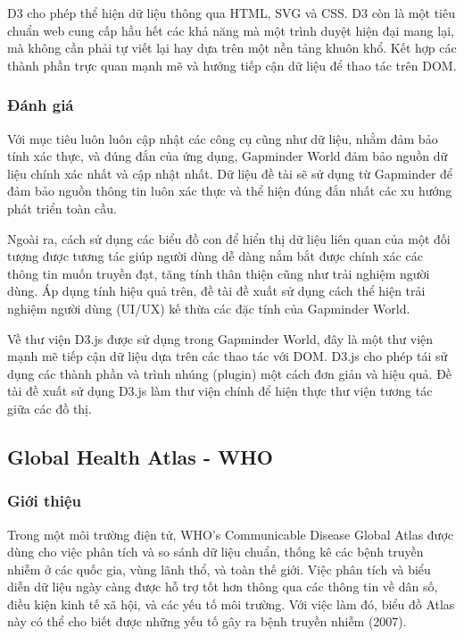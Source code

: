 \documentclass[12pt,a4paper,oneside]{article}
\begin{document}
D3 cho phép thể hiện dữ liệu thông qua HTML, SVG và CSS. D3 còn là một tiêu chuẩn web cung cấp hầu hết các khả năng mà một trình duyệt hiện đại mang lại, mà không cần phải tự viết lại hay dựa trên một nền tảng khuôn khổ. Kết hợp các thành phần trực quan mạnh mẽ và hướng tiếp cận dữ liệu để thao tác trên DOM.

\subsubsection{Đánh giá}
Với mục tiêu luôn luôn cập nhật các công cụ cũng như dữ liệu, nhằm đảm bảo tính xác thực, và đúng đắn của ứng dụng, Gapminder World đảm bảo nguồn dữ liệu chính xác nhất và cập nhật nhất.
Dữ liệu đề tài sẽ sử dụng từ Gapminder để đảm bảo nguồn thông tin luôn xác thực và thể hiện đúng đắn nhất các xu hướng phát triển toàn cầu.

Ngoài ra, cách sử dụng các biểu đồ con để hiển thị dữ liệu liên quan của một đối tượng được tương tác giúp người dùng dễ dàng nắm bắt được chính xác các thông tin muốn truyền đạt, tăng tính thân thiện cũng như trải nghiệm người dùng. Áp dụng tính hiệu quả trên, đề tài đề xuất sử dụng cách thể hiện trải nghiệm người dùng (UI/UX) kế thừa các đặc tính của Gapminder World. 

Về thư viện D3.js được sử dụng trong Gapminder World, đây là một thư viện mạnh mẽ tiếp cận dữ liệu dựa trên các thao tác với DOM. D3.js cho phép tái sử dụng các thành phần và trình nhúng (plugin) một cách đơn giản và hiệu quả. Đề tài đề xuất sử dụng D3.js làm thư viện chính để hiện thực thư viện tương tác giữa các đồ thị.

\subsection{Global Health Atlas - WHO}
\subsubsection{Giới thiệu}
Trong một môi trường điện tử, WHO’s Communicable Disease Global Atlas được dùng cho việc phân tích và so sánh dữ liệu chuẩn, thống kê các bệnh truyền nhiễm ở các quốc gia, vùng lãnh thổ, và toàn thế giới. Việc phân tích và biểu diễn dữ liệu ngày càng được hỗ trợ tốt hơn thông qua các thông tin về dân số, điều kiện kinh tế xã hội, và các yếu tố môi trường. Với việc làm đó, biểu đồ Atlas này có thể cho biết được những yếu tố gây ra bệnh truyền nhiễm (2007)\cite{gha}.
\end{document}

